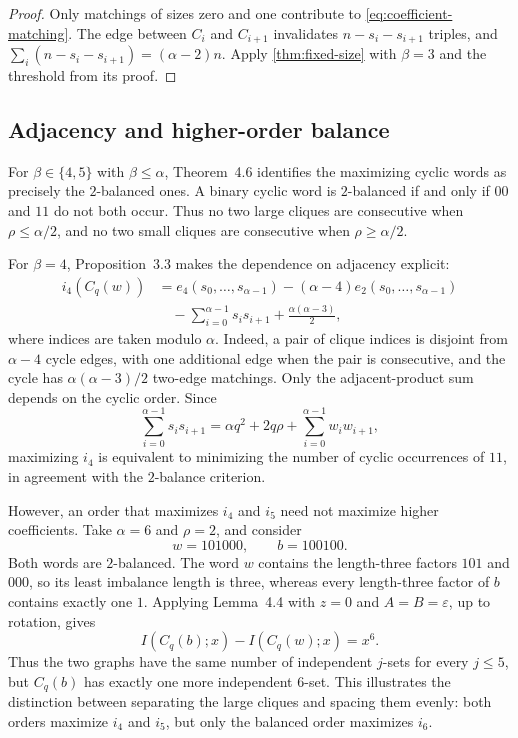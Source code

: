 \documentclass[11pt]{article}
\theoremstyle{definition}
\begin{document}
\begin{proof}
Only matchings of sizes zero and one contribute to
\eqref{eq:coefficient-matching}. The edge between $C_i$ and $C_{i+1}$
invalidates $n-s_i-s_{i+1}$ triples, and
$\sum_i(n-s_i-s_{i+1})=(\alpha-2)n$. Apply
\cref{thm:fixed-size} with $\beta=3$ and the threshold from its proof.
\end{proof}

\subsection{Adjacency and higher-order balance}

For $\beta\in\{4,5\}$ with $\beta\le\alpha$, Theorem~4.6 identifies
the maximizing cyclic words as precisely the $2$-balanced ones.
A binary cyclic word is $2$-balanced if and only if $00$ and $11$
do not both occur. Thus no two large cliques are consecutive when
$\rho\le\alpha/2$, and no two small cliques are consecutive when
$\rho\ge\alpha/2$.

For $\beta=4$, Proposition~3.3 makes the dependence on adjacency
explicit:
\begin{equation}
\begin{aligned}
 i_4(C_q(w))
 &=e_4(s_0,\ldots,s_{\alpha-1})
   -(\alpha-4)e_2(s_0,\ldots,s_{\alpha-1})\\
 &\quad-\sum_{i=0}^{\alpha-1}s_i s_{i+1}
   +\frac{\alpha(\alpha-3)}2,
\end{aligned}
\end{equation}
where indices are taken modulo $\alpha$.
Indeed, a pair of clique indices is disjoint from $\alpha-4$
cycle edges, with one additional edge when the pair is consecutive,
and the cycle has $\alpha(\alpha-3)/2$ two-edge matchings.
Only the adjacent-product sum depends on the cyclic order. Since
\[
 \sum_{i=0}^{\alpha-1}s_i s_{i+1}
 =\alpha q^2+2q\rho
  +\sum_{i=0}^{\alpha-1}w_iw_{i+1},
\]
maximizing $i_4$ is equivalent to minimizing the number of cyclic
occurrences of $11$, in agreement with the $2$-balance criterion.

However, an order that maximizes $i_4$ and $i_5$ need not maximize
higher coefficients. Take $\alpha=6$ and $\rho=2$, and consider
\[
 w=101000,\qquad b=100100.
\]
Both words are $2$-balanced. The word $w$ contains the length-three
factors $101$ and $000$, so its least imbalance length is three,
whereas every length-three factor of $b$ contains exactly one $1$.
Applying Lemma~4.4 with $z=0$ and $A=B=\varepsilon$, up to rotation,
gives
\[
 I(C_q(b);x)-I(C_q(w);x)=x^6.
\]
Thus the two graphs have the same number of independent $j$-sets
for every $j\le5$, but $C_q(b)$ has exactly one more independent
$6$-set. This illustrates the distinction between separating the
large cliques and spacing them evenly: both orders maximize $i_4$
and $i_5$, but only the balanced order maximizes $i_6$.
\end{document}
